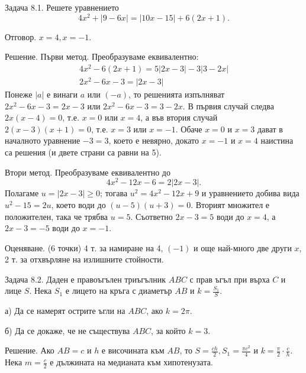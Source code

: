
Задача 8.1. Решете уравнението
$$
4 x^{2}+|9-6 x|=|10 x-15|+6(2 x+1) .
$$

Отговор. $x=4, x=-1$.

Решение. Първи метод. Преобразуваме еквивалентно:
$$
\begin{gathered}
4 x^{2}-6(2 x+1)=5|2 x-3|-3|3-2 x| \\
2 x^{2}-6 x-3=|2 x-3|
\end{gathered}
$$
Понеже $|a|$ е винаги $a$ или $(-a)$, то решенията изпълняват $2 x^{2}-6 x-3=2 x-3$ или $2 x^{2}-6 x-3=3-2 x$. В първия случай следва $2 x(x-4)=0$, т.е. $x=0$ или $x=4$, а във втория случай $2(x-3)(x+1)=0$, т.е. $x=3$ или $x=-1$. Обаче $x=0$ и $x=3$ дават в началното уравнение $-3=3$, което е невярно, докато $x=-1$ и $x=4$ наистина са решения (и двете страни са равни на 5).

Втори метод. Преобразуваме еквивалентно до
$$
4 x^{2}-12 x-6=2|2 x-3| .
$$
Полагаме $u=|2 x-3| \geq 0$; тогава $u^{2}=4 x^{2}-12 x+9$ и уравнението добива вида $u^{2}-15=2 u$, което води до $(u-5)(u+3)=0$. Вторият множител е положителен, така че трябва $u=5$. Съответно $2 x-3=5$ води до $x=4$, а $2 x-3=-5$ води до $x=-1$.

Оценяване. (6 точки) 4 т. за намиране на 4, $(-1)$ и още най-много две други $x$, 2 т. за отхвърляне на излишните стойности.

Задача 8.2. Даден е правоъгълен триъгълник $A B C$ с прав ъгъл при върха $C$ и лице $S$. Нека $S_{1}$ е лицето на кръга с диаметър $A B$ и $k=\frac{S_{1}}{S}$.

а) Да се намерят острите ъгли на $A B C$, ако $k=2 \pi$.

б) Да се докаже, че не съществува $A B C$, за който $k=3$.

Решение. Ако $A B=c$ и $h$ е височината към $A B$, то $S=\frac{c h}{2}, S_{1}=\frac{\pi c^{2}}{4}$ и $k=\frac{\pi}{2} \cdot \frac{c}{h}$. Нека $m=\frac{c}{2}$ е дължината на медианата към хипотенузата.

